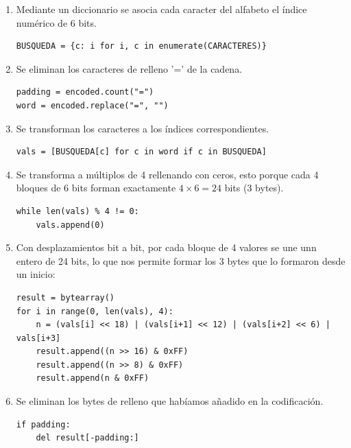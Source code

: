 \documentclass[12pt, a4paper]{article}
\begin{document}
\begin{itemize}
    \begin{enumerate}
    \item Mediante un diccionario se asocia cada caracter del alfabeto el índice numérico de 6 bits.

\begin{verbatim}
BUSQUEDA = {c: i for i, c in enumerate(CARACTERES)}
\end{verbatim}

    \item Se eliminan los caracteres de relleno '=' de la cadena.

\begin{verbatim}
padding = encoded.count("=")
word = encoded.replace("=", "")
\end{verbatim}

    \item Se transforman los caracteres a los índices correspondientes.

\begin{verbatim}
vals = [BUSQUEDA[c] for c in word if c in BUSQUEDA]
\end{verbatim}

    \item Se transforma a múltiplos de 4 rellenando con ceros, esto porque cada 4 bloques de 6 bits forman
    exactamente $4 \times 6 = 24$ bits (3 bytes).

\begin{verbatim}
while len(vals) % 4 != 0:
    vals.append(0)
\end{verbatim}

    \item Con desplazamientos bit a bit, por cada bloque de 4 valores se une unn entero de 24 bits,
    lo que nos permite formar los 3 bytes que lo formaron desde un inicio:

\begin{verbatim}
result = bytearray()
for i in range(0, len(vals), 4):
    n = (vals[i] << 18) | (vals[i+1] << 12) | (vals[i+2] << 6) | vals[i+3]
    result.append((n >> 16) & 0xFF)
    result.append((n >> 8) & 0xFF)
    result.append(n & 0xFF)
\end{verbatim}

    \item Se eliminan los bytes de relleno que habíamos añadido en la codificación.

\begin{verbatim}
if padding:
    del result[-padding:]
\end{verbatim}

    \end{enumerate}
\end{itemize}
\end{document}
